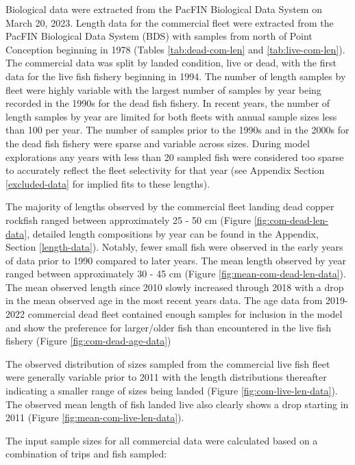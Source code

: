 \documentclass[11pt,
  english,
  letterpaper,
]{article}
\begin{document}
\hfill\break

Biological data were extracted from the PacFIN Biological Data System on March 20, 2023. Length data for the commercial fleet were extracted from the PacFIN Biological Data System (BDS) with samples from north of Point Conception beginning in 1978 (Tables \ref{tab:dead-com-len} and \ref{tab:live-com-len}). The commercial data was split by landed condition, live or dead, with the first data for the live fish fishery beginning in 1994. The number of length samples by fleet were highly variable with the largest number of samples by year being recorded in the 1990s for the dead fish fishery. In recent years, the number of length samples by year are limited for both fleets with annual sample sizes less than 100 per year. The number of samples prior to the 1990s and in the 2000s for the dead fish fishery were sparse and variable across sizes. During model explorations any years with less than 20 sampled fish were considered too sparse to accurately reflect the fleet selectivity for that year (see Appendix Section \ref{excluded-data} for implied fits to these lengths).

The majority of lengths observed by the commercial fleet landing dead copper rockfish ranged between approximately 25 - 50 cm (Figure \ref{fig:com-dead-len-data}, detailed length compositions by year can be found in the Appendix, Section \ref{length-data}). Notably, fewer small fish were observed in the early years of data prior to 1990 compared to later years. The mean length observed by year ranged between approximately 30 - 45 cm (Figure \ref{fig:mean-com-dead-len-data}). The mean observed length since 2010 slowly increased through 2018 with a drop in the mean observed age in the most recent years data. The age data from 2019-2022 commercial dead fleet contained enough samples for inclusion in the model and show the preference for larger/older fish than encountered in the live fish fishery (Figure \ref{fig:com-dead-age-data})

The observed distribution of sizes sampled from the commercial live fish fleet were generally variable prior to 2011 with the length distributions thereafter indicating a smaller range of sizes being landed (Figure \ref{fig:com-live-len-data}). The observed mean length of fish landed live also clearly shows a drop starting in 2011 (Figure \ref{fig:mean-com-live-len-data}).

The input sample sizes for all commercial data were calculated based on a combination of trips and fish sampled:
\end{document}
